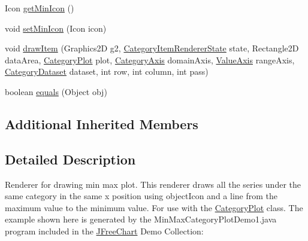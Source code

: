 \begin{DoxyCompactItemize}
\item 
Icon \mbox{\hyperlink{classorg_1_1jfree_1_1chart_1_1renderer_1_1category_1_1_min_max_category_renderer_a2a9fc133d63761d1ced80ea2d45de730}{get\+Min\+Icon}} ()
\item 
void \mbox{\hyperlink{classorg_1_1jfree_1_1chart_1_1renderer_1_1category_1_1_min_max_category_renderer_ab61a4df28c34c2298623f849a38ef9ee}{set\+Min\+Icon}} (Icon icon)
\item 
void \mbox{\hyperlink{classorg_1_1jfree_1_1chart_1_1renderer_1_1category_1_1_min_max_category_renderer_a9165c8a1956fb5a1e6112f2aeb8207e9}{draw\+Item}} (Graphics2D g2, \mbox{\hyperlink{classorg_1_1jfree_1_1chart_1_1renderer_1_1category_1_1_category_item_renderer_state}{Category\+Item\+Renderer\+State}} state, Rectangle2D data\+Area, \mbox{\hyperlink{classorg_1_1jfree_1_1chart_1_1plot_1_1_category_plot}{Category\+Plot}} plot, \mbox{\hyperlink{classorg_1_1jfree_1_1chart_1_1axis_1_1_category_axis}{Category\+Axis}} domain\+Axis, \mbox{\hyperlink{classorg_1_1jfree_1_1chart_1_1axis_1_1_value_axis}{Value\+Axis}} range\+Axis, \mbox{\hyperlink{interfaceorg_1_1jfree_1_1data_1_1category_1_1_category_dataset}{Category\+Dataset}} dataset, int row, int column, int pass)
\item 
boolean \mbox{\hyperlink{classorg_1_1jfree_1_1chart_1_1renderer_1_1category_1_1_min_max_category_renderer_ad6748a008e7f64d7ac03062c1697d4c5}{equals}} (Object obj)
\end{DoxyCompactItemize}
\subsection*{Additional Inherited Members}


\subsection{Detailed Description}
Renderer for drawing min max plot. This renderer draws all the series under the same category in the same x position using {\ttfamily object\+Icon} and a line from the maximum value to the minimum value. For use with the \mbox{\hyperlink{}{Category\+Plot}} class. The example shown here is generated by the {\ttfamily Min\+Max\+Category\+Plot\+Demo1.\+java} program included in the \mbox{\hyperlink{classorg_1_1jfree_1_1chart_1_1_j_free_chart}{J\+Free\+Chart}} Demo Collection\+: ~\newline
~\newline
  

